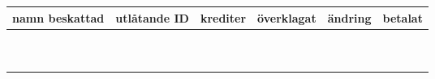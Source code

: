 \documentclass{letter}
\begin{document}
\begin{tabular}{ |p{4.5cm}|p{2cm}|p{2cm}|p{1.5cm}|p{1.5cm}|p{1.5cm}|}
	namn beskattad &utlåtande ID & krediter & \small överklagat & ändring & betalat\\  \hline
	\vspace{0.4cm}& \vspace{0.4cm} & \vspace{0.4cm} & \Square & \Square & \Square  \\\hline	
	\vspace{0.4cm}& \vspace{0.4cm} & \vspace{0.4cm} & \Square & \Square & \Square  \\\hline
	\vspace{0.4cm}& \vspace{0.4cm} & \vspace{0.4cm} & \Square & \Square & \Square  \\\hline
	\vspace{0.4cm}& \vspace{0.4cm} & \vspace{0.4cm} & \Square & \Square & \Square  \\\hline
	\vspace{0.4cm}& \vspace{0.4cm} & \vspace{0.4cm} & \Square & \Square & \Square  \\\hline
	\vspace{0.4cm}& \vspace{0.4cm} & \vspace{0.4cm} & \Square & \Square & \Square  \\\hline
	\vspace{0.4cm}& \vspace{0.4cm} & \vspace{0.4cm} & \Square & \Square & \Square  \\\hline
	\vspace{0.4cm}& \vspace{0.4cm} & \vspace{0.4cm} & \Square & \Square & \Square  \\\hline
	\vspace{0.4cm}& \vspace{0.4cm} & \vspace{0.4cm} & \Square & \Square & \Square  \\\hline
	\vspace{0.4cm}& \vspace{0.4cm} & \vspace{0.4cm} & \Square & \Square & \Square  \\\hline

\end{tabular}
\end{document}
